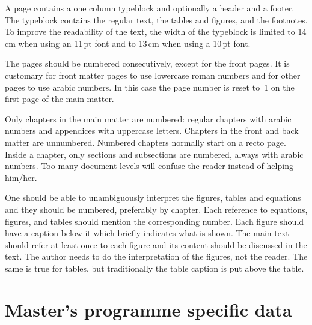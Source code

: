 \documentclass[11pt,article,oneside,a4paper]{memoir}
\begin{document}
A page contains a one column typeblock and optionally a header and a
footer. The typeblock contains the regular text, the tables and figures,
and the footnotes. To improve the readability of the text, the width of the
typeblock is limited to 14\,cm when using an 11\,pt font and to 13\,cm when
using a 10\,pt font.

The pages should be numbered consecutively, except for the front pages. It
is customary for front matter pages to use lowercase roman numbers and for
other pages to use arabic numbers. In this case the page number is reset
to~1 on the first page of the main matter.

Only chapters in the main matter are numbered: regular chapters with arabic
numbers and appendices with uppercase letters. Chapters in the front and
back matter are unnumbered.
Numbered chapters normally start on a recto page.
Inside a chapter, only sections and subsections are numbered, always with
arabic numbers. Too many document levels will confuse the reader instead of
helping him/her.

One should be able to unambiguously interpret the figures, tables and
equations and they should be numbered, preferably by chapter. Each
reference to equations, figures, and tables should mention the
corresponding number. Each figure should have a caption below it which
briefly indicates what is shown. The main text should refer at least once
to each figure and its content should be discussed in the text. The author
needs to do the interpretation of the figures, not the reader. The same is
true for tables, but traditionally the table caption is put above the table.

\chapter{Master's programme specific data}
\begingroup
\makeatletter
\let\kulemt@end@master@def\endinput
\def\ProvidesFile#1[#2]{This section describes some master's programme specific
  data as it was known on \printdateTeX{#2}.\par}
\let\kulemt@div@master\@gobble
\let\kulemt@def@master\@gobbletwo
\newcommand*\kulemt@obsolete@master[3][]{}

\endgroup
\end{document}
